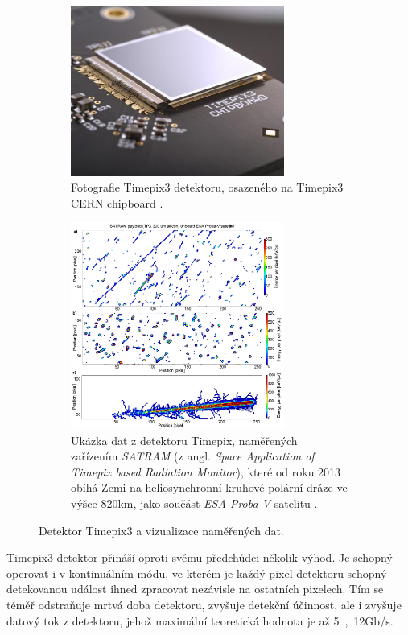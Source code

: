 \begin{figure}[bh]
    \begin{center}
        \begin{subfigure}{7.0cm}
            \includegraphics[width=7cm]{figures/timepix3.jpg}    
            \caption{Fotografie Timepix3 detektoru, osazeného na Timepix3 CERN chipboard \cite{medipix_from_medical_img_to_space}.}
        \end{subfigure}
        \hspace{0.1cm}
        \begin{subfigure}{7.0cm}
            \includegraphics[width=7cm]{figures/timepix_data_satram.png}    
            \caption{Ukázka dat z detektoru Timepix, naměřených zařízením \textit{SATRAM} (z angl. \textit{Space Application of Timepix based Radiation Monitor}), které od roku 2013 obíhá Zemi na heliosynchronní kruhové polární dráze ve výšce \unit{820}{km}, jako součást \textit{ESA Proba-V} satelitu \cite{PlatkevicDisertace}.}
        \end{subfigure}
	\end{center}
    \caption{Detektor Timepix3 a vizualizace naměřených dat.}
	\label{fig:master:frontend:detector_detail}
\end{figure}

Timepix3 detektor přináší oproti svému předchůdci několik výhod. Je schopný operovat i v kontinuálním módu, ve kterém je každý pixel detektoru schopný detekovanou událost ihned zpracovat nezávisle na ostatních pixelech. Tím se téměř odstraňuje mrtvá doba detektoru, zvyšuje detekční účinnost, ale i zvyšuje datový tok z detektoru, jehož maximální teoretická hodnota je až \unit{5,12}{Gb/s}.

